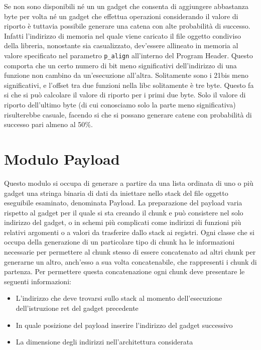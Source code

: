Se non sono disponibili né un un gadget che consenta di aggiungere
abbastanza byte per volta né un gadget che effettua operazioni
considerando il valore di riporto è tuttavia possibile generare una
catena con alte probabilità di successo. Infatti l'indirizzo di
memoria nel quale viene caricato il file oggetto condiviso della
libreria, nonostante sia casualizzato, dev'essere allineato in memoria
al valore specificato nel parametro \lstinline{p_align} all'interno
del Program Header. Questo comporta che un certo numero di bit meno
significativi dell'indirizzo di una funzione non cambino da
un'esecuzione all'altra. Solitamente sono i 21bis meno significativi,
e l'offset tra due funzioni nella libc solitamente è tre byte. Questo
fa si che si può calcolare il valore di riporto per i primi due
byte. Solo il valore di riporto dell'ultimo byte (di cui conosciamo
solo la parte meno significativa) risulterebbe casuale, facendo si che
si possano generare catene con probabilità di successo pari almeno al
50\%.


\section{Modulo Payload}

Questo modulo si occupa di generare a partire da una lista ordinata di
uno o più gadget una stringa binaria di dati da iniettare nello stack
del file oggetto eseguibile esaminato, denominata Payload. La
preparazione del payload varia rispetto al gadget per il quale si sta
creando il chunk e può consistere nel solo indirizzo del gadget, o in
schemi più complicati come indirizzi di funzioni più relativi
argomenti o a valori da trasferire dallo stack ai registri. Ogni
classe che si occupa della generazione di un particolare tipo di chunk
ha le informazioni necessarie per permettere al chunk stesso di essere
concatenato ad altri chunk per generarne un altro, anch'esso a sua
volta concatenabile, che rappresenti i chunk di partenza. Per
permettere questa concatenazione ogni chunk deve presentare le
seguenti informazioni:


\begin{itemize}

\item L'indirizzo che deve trovarsi sullo stack al momento
  dell'esecuzione dell'istruzione ret del gadget precedente 

\item In quale posizione del payload inserire l'indirizzo del gadget
  successivo

\item La dimensione degli indirizzi nell'architettura considerata

\end{itemize}


